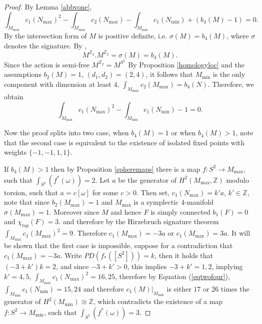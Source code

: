 \documentclass[12pt]{article}
\begin{document}
\begin{proof}
By Lemma \ref{abbvone}, $$\int_{M_{\max}} c_{1}(N_{\max})^2 - \int_{M_{\max}} c_{2}(N_{\max}) - \int_{M_{\min}} c_{1}(N_{\min}) + (b_{4}(M)-1)=0 .$$  By \cite[Theorem 3.4]{L2} the intersection form of $M$ is positive definite, i.e. $\sigma(M) = b_{4}(M)$, where $\sigma$ denotes the signature. By \cite[Main Result]{JO}, $$M^{\mathbb{Z}_2}.M^{\mathbb{Z}_2} = \sigma(M) = b_{4}(M) . $$ Since the action is semi-free $M^{\mathbb{Z}_2} = M^{S^1}$ By Proposition \ref{homologyloc} and the assumptions $b_{2}(M)=1$, $(d_1,d_2)=(2,4)$, it follows that $M_{\min}$ is the only component with dimension at least $4$, $\int_{M_{\max}} c_{2}(M_{\max}) =b_{4}(N)$. Therefore, we obtain \begin{equation} \label{eqtwofour} \int_{M_{\max}} c_{1}(N_{\max})^2  - \int_{M_{\min}} c_{1}(N_{\min})  -1 =0. \end{equation}

Now the proof splits into two case, when $b_{4}(M)=1$ or when $b_{4}(M)>1$, note that the second case is equivalent to the existence of isolated fixed points with weights $\{-1,-1,1,1\}$.



If $b_{4}(M)> 1$ then by Proposition \ref{spheremaps}  there is  a map  $f: S^2 \rightarrow M_{\max}$, such that $\int_{S^2} (f^{*}(\omega) ) = 2$.  Let $a$ be the generator of $H^{2}(M_{\max},\mathbb{Z})$ modulo torsion, such that $a = c[\omega]$ for some $c>0$. Then set, $c_{1}(N_{\max}) = k'a$, $k' \in \mathbb{Z}$, note that since $b_{2}(M_{\max})=1$ and $M_{\max}$ is a symplectic $4$-manifold $\sigma(M_{\max})=1$. Moreover since $M$ and hence $F$ \cite{Li} is simply connected $b_{1}(F)=0$  and $\chi_{top}(F)=3$.  and therefore by the Hirzebruch signature theorem $\int_{M_{\max}} c_{1}(M_{\max})^2 = 9$. Therefore $c_{1}(M_{\max}) = -3a$ or $c_{1}(M_{\max}) = 3a$. It will be shown that the first case is impossible, suppose for a contradiction that  $c_{1}(M_{\max}) = -3a$.   Write $PD(f_{*}([S^2])) = k$, then it holds that  $(-3+k') k = 2$, and since $-3 +k'>0$, this implies $-3 +k' = 1,2$, implying $k' = 4,5$, $\int_{M_{\max}} c_{1}(N_{\max})^2 = 16,25$, therefore by  Equation (\ref{eqtwofour}), $\int_{M_{\min}} c_{1}(N_{\min}) = 15,24$ and therefore $c_{1}(M)|_{M_{\min}}$ is either $17$ or $26$ times the generator of $H^{2}(M_{\min}) \cong \mathbb{Z}$, which contradicts the existence of a map   $f: S^2 \rightarrow M_{\min}$, such that $\int_{S^2} (f^{*}(\omega) ) = 3 .$ 


\end{proof}
\end{document}
